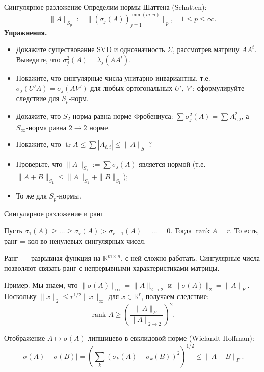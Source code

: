 \documentclass[12pt,handout]{beamer}
\renewcommand\le{\leqslant}
\renewcommand\ge{\geqslant}
\newcommand\R{\mathbb R}
\DeclareMathOperator{\rank}{rank}
\DeclareMathOperator{\tr}{tr}
\begin{document}
\begin{frame}{Сингулярное разложение}
    Определим нормы Шаттена (Schatten):
    $$
    \|A\|_{S_p} := \|(\sigma_j(A))_{j=1}^{\min(m,n)}\|_p,\quad 1\le p\le \infty.
    $$
    \textbf{Упражнения.}
    \begin{itemize}
        \item Докажите существование SVD и однозначность $\Sigma$, рассмотрев
            матрицу $AA^t$. Выведите, что $\sigma_j^2(A)=\lambda_j(AA^t)$.
        \item Покажите, что сингулярные числа унитарно-инвариантны, т.е.
            $\sigma_j(U'A)=\sigma_j(AV')$ для любых ортогональных $U'$, $V'$;
            сформулируйте следствие для $S_p$-норм.
        \item Докажите, что $S_2$-норма равна норме Фробениуса:
            $\sum\sigma_j^2(A) = \sum A_{i,j}^2$, а $S_\infty$-норма равна $2\to2$ норме.
        \item Покажите, что $\tr A \le \sum |A_{i,i}|\le \|A\|_{S_1}$?
        \item Проверьте, что $\|A\|_{S_1} := \sum \sigma_j(A)$ является нормой
            (т.е. $\|A+B\|_{S_1} \le \|A\|_{S_1} + \|B\|_{S_1}$);
        \item То же для $S_p$-нормы.
    \end{itemize}

\end{frame}

\begin{frame}{Сингулярное разложение и ранг}

    Пусть $\sigma_1(A)\ge\ldots\ge \sigma_r(A)>\sigma_{r+1}(A)=\ldots=0$. Тогда
    $\rank A=r$. То есть, ранг = кол-во ненулевых сингулярных чисел.
    \vspace{5pt}

    Ранг~--- разрывная функция на $\mathbb R^{m\times n}$, с ней сложно
    работать. Сингулярные числа позволяют связать ранг с непрерывными
    характеристиками матрицы.
    
    Пример. Мы знаем, что $\|\sigma(A)\|_\infty = \|A\|_{2\to 2}$ и $\|\sigma(A)\|_2 = \|A\|_F$.
    Поскольку $\|x\|_2 \le r^{1/2}\|x\|_\infty$ для $x\in\R^r$, получаем
    следствие:
    $$
    \rank A \ge \left(\frac{\|A\|_F}{\|A\|_{2\to 2}}\right)^2.
    $$

    Отображение $A\mapsto\sigma(A)$ липшицево в евклидовой норме
    (Wielandt-Hoffman):
    $$
    |\sigma(A)-\sigma(B)| = (\sum_k (\sigma_k(A)-\sigma_k(B))^2)^{1/2} \le
    \|A-B\|_F.
    $$

\end{frame}
\end{document}
